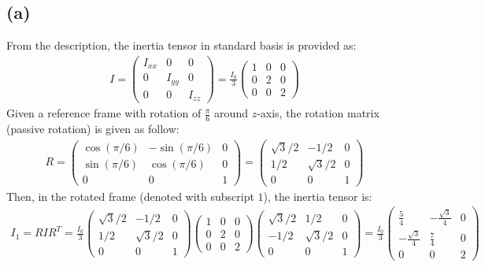 \documentclass{article}
\begin{document}
\subsection*{(a)}
From the description, the inertia tensor in standard basis is provided as:
\begin{align}
    I = \begin{pmatrix}
        I_{xx}&0&0\\
        0&I_{yy}&0\\
        0&0&I_{zz}
    \end{pmatrix} = \frac{I_0}{3}\begin{pmatrix}
        1&0&0\\
        0&2&0\\
        0&0&2
    \end{pmatrix}
\end{align}
Given a reference frame with rotation of $\frac{\pi}{6}$ around $z$-axis, the rotation matrix (passive rotation) is given as follow:
\begin{align}
    R = \begin{pmatrix}
        \cos(\pi/6)&-\sin(\pi/6)&0\\
        \sin(\pi/6)&\cos(\pi/6)&0\\
        0&0&1
    \end{pmatrix} = \begin{pmatrix}
        \sqrt{3}/2 & -1/2&0\\
        1/2&\sqrt{3}/2&0\\
        0&0&1
    \end{pmatrix}
\end{align}
Then, in the rotated frame (denoted with subscript $1$), the inertia tensor is:
\begin{align}
    I_1 = RIR^T = \frac{I_0}{3}\begin{pmatrix}
        \sqrt{3}/2 & -1/2&0\\
        1/2&\sqrt{3}/2&0\\
        0&0&1
    \end{pmatrix}\begin{pmatrix}
        1&0&0\\0&2&0\\0&0&2
    \end{pmatrix}\begin{pmatrix}
        \sqrt{3}/2 & 1/2&0\\
        -1/2&\sqrt{3}/2&0\\
        0&0&1
    \end{pmatrix} = \frac{I_0}{3}\begin{pmatrix}
        \frac{5}{4} & -\frac{\sqrt{3}}{4} & 0\\
        -\frac{\sqrt{3}}{4} & \frac{7}{4}&0\\
        0&0&2
    \end{pmatrix}
\end{align}
\end{document}

